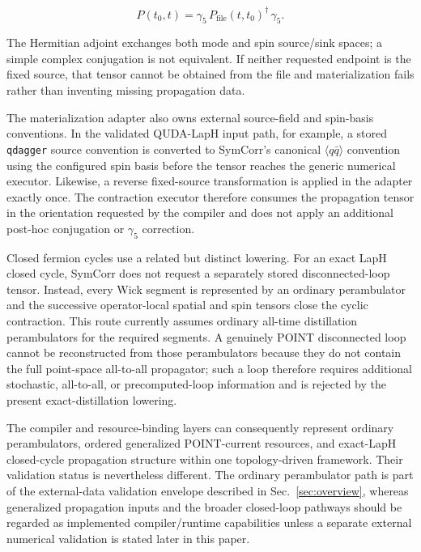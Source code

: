 \documentclass[11pt]{article}
\begin{document}
\begin{equation}
P(t_0,t)
=
\gamma_5\,
P_{\mathrm{file}}(t,t_0)^\dagger
\,\gamma_5 .
\label{eq:fixed_source_reverse_propagation}
\end{equation}

The Hermitian adjoint exchanges both mode and spin source/sink spaces; a simple
complex conjugation is not equivalent. If neither requested endpoint is the
fixed source, that tensor cannot be obtained from the file and materialization
fails rather than inventing missing propagation data.

The materialization adapter also owns external source-field and spin-basis
conventions. In the validated QUDA-LapH input path, for example, a stored
\texttt{qdagger} source convention is converted to SymCorr's canonical
\(\langle q\bar q\rangle\) convention using the configured spin basis before
the tensor reaches the generic numerical executor. Likewise, a reverse
fixed-source transformation is applied in the adapter exactly once. The
contraction executor therefore consumes the propagation tensor in the
orientation requested by the compiler and does not apply an additional
post-hoc conjugation or \(\gamma_5\) correction.

Closed fermion cycles use a related but distinct lowering. For an exact LapH
closed cycle, SymCorr does not request a separately stored disconnected-loop
tensor. Instead, every Wick segment is represented by an ordinary perambulator
and the successive operator-local spatial and spin tensors close the cyclic
contraction. This route currently assumes ordinary all-time distillation
perambulators for the required segments. A genuinely POINT disconnected loop
cannot be reconstructed from those perambulators because they do not contain
the full point-space all-to-all propagator; such a loop therefore requires
additional stochastic, all-to-all, or precomputed-loop information and is
rejected by the present exact-distillation lowering.

The compiler and resource-binding layers can consequently represent ordinary
perambulators, ordered generalized POINT-current resources, and exact-LapH
closed-cycle propagation structure within one topology-driven framework. Their
validation status is nevertheless different. The ordinary perambulator path is
part of the external-data validation envelope described in
Sec.~\ref{sec:overview}, whereas generalized propagation inputs and the broader
closed-loop pathways should be regarded as implemented compiler/runtime
capabilities unless a separate external numerical validation is stated later in
this paper.
\end{document}

